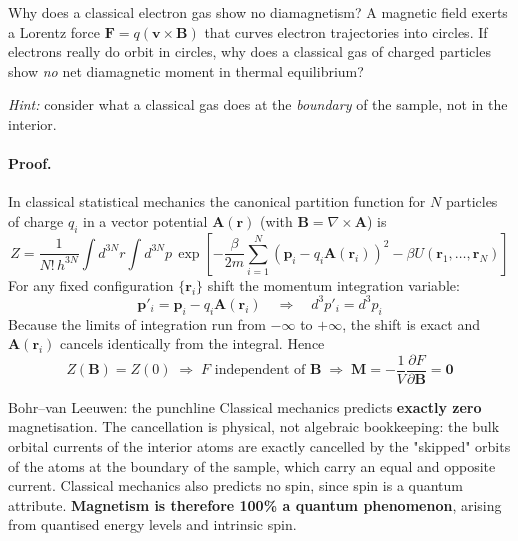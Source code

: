 \documentclass[11pt,a4paper]{article}
\newcommand{\vb}[1]{\mathbf{#1}}
\begin{document}
\begin{checkpointbox}{Why does a classical electron gas show no diamagnetism?}
A magnetic field exerts a Lorentz force $\vb{F} = q(\vb{v}\times\vb{B})$ that curves electron trajectories into circles. If electrons really do orbit in circles, why does a classical gas of charged particles show \emph{no} net diamagnetic moment in thermal equilibrium?

\emph{Hint:} consider what a classical gas does at the \emph{boundary} of the sample, not in the interior.
\end{checkpointbox}

\paragraph{Proof.}
In classical statistical mechanics the canonical partition function for $N$ particles of charge $q_i$ in a vector potential $\vb{A}(\vb{r})$ (with $\vb{B} = \nabla\times\vb{A}$) is
\begin{equation}
    Z = \frac{1}{N!\,h^{3N}} \int d^{3N}r \int d^{3N}p\,
    \exp\left[ -\frac{\beta}{2m}\sum_{i=1}^{N}\left(\vb{p}_i - q_i\vb{A}(\vb{r}_i)\right)^2
    - \beta U(\vb{r}_1,\dots,\vb{r}_N) \right]
    \label{eq:bvlZ}
\end{equation}
For any fixed configuration $\{\vb{r}_i\}$ shift the momentum integration variable:
\begin{equation}
    \vb{p}'_i = \vb{p}_i - q_i\vb{A}(\vb{r}_i) \quad\Longrightarrow\quad d^3p'_i = d^3p_i
    \label{eq:bvlshift}
\end{equation}
Because the limits of integration run from $-\infty$ to $+\infty$, the shift is exact and $\vb{A}(\vb{r}_i)$ cancels identically from the integral. Hence
\begin{equation}
    Z(\vb{B}) = Z(0) \;\Longrightarrow\; F \text{ independent of } \vb{B}
    \;\Longrightarrow\; \vb{M} = -\frac{1}{V}\frac{\partial F}{\partial \vb{B}} = \vb{0}
    \label{eq:bvl}
\end{equation}

\begin{takeawaybox}{Bohr--van Leeuwen: the punchline}
Classical mechanics predicts \textbf{exactly zero} magnetisation. The cancellation is physical, not algebraic bookkeeping: the bulk orbital currents of the interior atoms are exactly cancelled by the "skipped" orbits of the atoms at the boundary of the sample, which carry an equal and opposite current. Classical mechanics also predicts no spin, since spin is a quantum attribute. \textbf{Magnetism is therefore 100\% a quantum phenomenon}, arising from quantised energy levels and intrinsic spin.
\end{takeawaybox}
\end{document}
